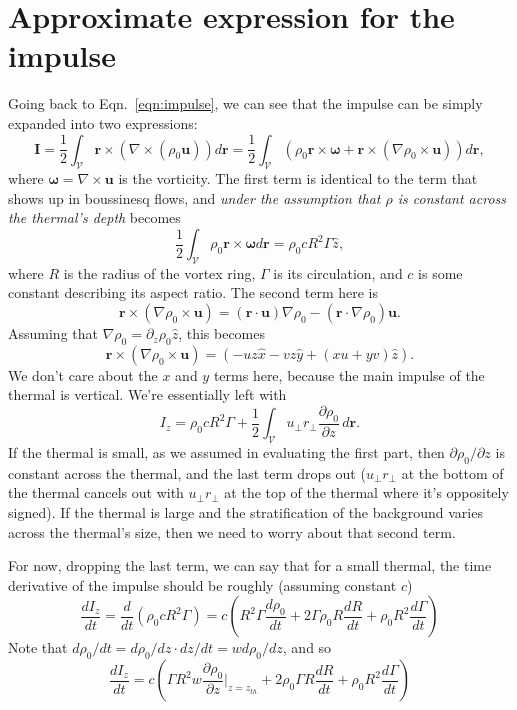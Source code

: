 \documentclass[onecolumn, amsmath, amsfonts, amssymb]{aastex62}
\newcommand{\grad}{\ensuremath{\nabla}}
\begin{document}
\section{Approximate expression for the impulse}
Going back to Eqn.~\ref{eqn:impulse}, we can see that the impulse can be simply expanded
into two expressions:
\begin{equation}
\bm{I} = \frac{1}{2}\int_{\mathcal{V}}\bm{r}\times(\grad\times(\rho_0\bm{u}))d\bm{r} 
= \frac{1}{2} \int_{\mathcal{V}} \left(\rho_0 \bm{r}\times \bm{\omega} + \bm{r} \times(\grad\rho_0 \times \bm{u}) \right) d\bm{r},
\end{equation}
where $\bm{\omega} = \grad\times\bm{u}$ is the vorticity.  The first term is identical to the term that shows up
in boussinesq flows, and \emph{under the assumption that $\rho$ is constant across the
thermal's depth} becomes \citep{saffman1970}
$$
\frac{1}{2} \int_{\mathcal{V}} \rho_0 \bm{r}\times \bm{\omega} d\bm{r} = \rho_0 c R^2 \Gamma \hat{z},
$$
where $R$ is the radius of the vortex ring, $\Gamma$ is its circulation, and $c$ is some constant describing its
aspect ratio. The second term here is
$$
\bm{r}\times(\grad\rho_0 \times\bm{u}) = (\bm{r}\cdot\bm{u})\grad\rho_0 - (\bm{r}\cdot\grad\rho_0)\bm{u}.
$$
Assuming that $\grad \rho_0 = \partial_z \rho_0 \hat{z}$, this becomes
$$
\bm{r}\times(\grad\rho_0 \times\bm{u}) = (-uz\hat{x} - vz\hat{y} + (xu + yv)\hat{z}).
$$
We don't care about the $x$ and $y$ terms here, because the main impulse of the thermal is vertical. We're essentially left with
$$
I_z = \rho_0 c R^2 \Gamma + \frac{1}{2}\int_{\mathcal{V}} u_{\perp} r_{\perp} \frac{\partial \rho_0}{\partial z} \,d\bm{r}.
$$
If the thermal is small, as we assumed in evaluating the first part, then
$\partial \rho_0 /\partial z$ is constant across the thermal, and the last term drops out
($u_{\perp} r_{\perp}$ at the bottom of the thermal cancels out with $u_{\perp} r_{\perp}$ at the top of the thermal
where it's oppositely signed).
If the thermal is large and the stratification of the background varies across the thermal's size, then we need to worry
about that second term.

For now, dropping the last term, we can say that for a small thermal, the time derivative of
the impulse should be roughly (assuming constant $c$)
$$
\frac{d I_z}{dt} = \frac{d}{dt}\left(\rho_0 c R^2 \Gamma\right) 
= c\left(R^2 \Gamma \frac{d\rho_0}{dt} + 2\Gamma \rho_0 R \frac{d R}{dt} + \rho_0 R^2 \frac{d\Gamma}{dt}\right)
$$
Note that $d\rho_0/dt = d\rho_0/dz \cdot dz/dt = w d\rho_0/dz$, and so
\begin{equation}
\boxed{
\frac{d I_z}{dt} = c\left(\Gamma R^2 w \frac{\partial \rho_0}{\partial z}\bigg|_{z=z_{th}}
+ 2 \rho_0 \Gamma R \frac{dR}{dt} + \rho_0 R^2 \frac{d\Gamma}{dt}\right)
}
\label{eqn:dIz_dt}
\end{equation}
\end{document}
